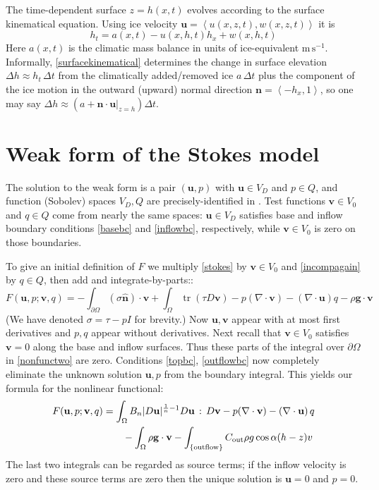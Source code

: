 \documentclass[letterpaper,final,12pt,reqno]{amsart}
\newcommand{\trace}{\operatorname{tr}}
\newcommand{\hbn}{\hat{\mathbf{n}}}
\newcommand{\bn}{\mathbf{n}}
\newcommand{\bu}{\mathbf{u}}
\newcommand{\bv}{\mathbf{v}}
\begin{document}
The time-dependent surface $z=h(x,t)$ evolves according to the surface kinematical equation.  Using ice velocity $\bu=\left<u(x,z,t),w(x,z,t)\right>$ it is
\begin{equation}
h_t = a(x,t) - u(x,h,t) h_x + w(x,h,t) \label{surfacekinematical}
\end{equation}
Here $a(x,t)$ is the climatic mass balance in units of ice-equivalent $\text{m}\,\text{s}^{-1}$.  Informally, \eqref{surfacekinematical} determines the change in surface elevation $\Delta h \approx h_t\,\Delta t$ from the climatically added/removed ice $a\,\Delta t$ plus the component of the ice motion in the outward (upward) normal direction $\bn = \left<-h_x,1\right>$, so one may say $\Delta h \approx \left(a + \bn\cdot \bu|_{z=h}\right) \Delta t$.


\section{Weak form of the Stokes model} \label{sec:weakform}

The solution to the weak form is a pair $(\bu,p)$ with $\bu\in V_D$ and $p \in Q$, and function (Sobolev) spaces $V_D,Q$ are precisely-identified in \cite{JouvetRappaz2011}.  Test functions $\bv\in V_0$ and $q\in Q$ come from nearly the same spaces: $\bu\in V_D$ satisfies base and inflow boundary conditions \eqref{basebc} and \eqref{inflowbc}, respectively, while $\bv\in V_0$ is zero on those boundaries.

To give an initial definition of $F$ we multiply \eqref{stokes} by $\bv\in V_0$ and \eqref{incompagain} by $q\in Q$, then add and integrate-by-parts::
\begin{equation}
F(\bu,p;\bv,q) = -\int_{\partial\Omega} (\sigma \hbn)\cdot \bv + \int_\Omega \trace(\tau D\bv) - p (\nabla \cdot \bv) - \left(\nabla \cdot \bu\right) q - \rho \mathbf{g} \cdot \bv \label{nonfunctwo}
\end{equation}
(We have denoted $\sigma=\tau-pI$ for brevity.)  Now $\bu,\bv$ appear with at most first derivatives and $p,q$ appear without derivatives.  Next recall that $\bv\in V_0$ satisfies $\bv=0$ along the base and inflow surfaces.  Thus these parts of the integral over $\partial\Omega$ in \eqref{nonfunctwo} are zero.  Conditions \eqref{topbc}, \eqref{outflowbc} now completely eliminate the unknown solution $\bu,p$ from the boundary integral.  This yields our formula for the nonlinear functional:
\begin{align}
F(\bu,p;\bv,q) &= \int_\Omega B_n |D\bu|^{\frac{1}{n} - 1} D\bu\,:\,D\bv - p (\nabla \cdot \bv) - \left(\nabla \cdot \bu\right) q \label{defineF} \\
    &\qquad  - \int_\Omega \rho \mathbf{g} \cdot \bv - \int_{\{\text{outflow}\}} C_{\text{out}} \rho g \cos\alpha (h-z) v  \notag
\end{align}
The last two integrals can be regarded as source terms; if the inflow velocity is zero and these source terms are zero then the unique solution is $\bu=0$ and $p=0$.
\end{document}

